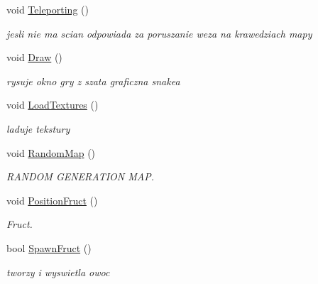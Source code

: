 \begin{DoxyCompactItemize}
\mbox{\label{class_snake_aadebf75d231d0c24c5d54cf7468ef857}} 
void \mbox{\hyperlink{class_snake_aadebf75d231d0c24c5d54cf7468ef857}{Teleporting}} ()
\begin{DoxyCompactList}\small\item\em jesli nie ma scian odpowiada za poruszanie weza na krawedziach mapy \end{DoxyCompactList}\item 
\mbox{\label{class_snake_a819c70fc5ed3dbb1b31eca548f659e8b}} 
void \mbox{\hyperlink{class_snake_a819c70fc5ed3dbb1b31eca548f659e8b}{Draw}} ()
\begin{DoxyCompactList}\small\item\em rysuje okno gry z szata graficzna snake\textquotesingle{}a \end{DoxyCompactList}\item 
\mbox{\label{class_snake_a4664d1acebc5de418688376679736342}} 
void \mbox{\hyperlink{class_snake_a4664d1acebc5de418688376679736342}{Load\+Textures}} ()
\begin{DoxyCompactList}\small\item\em laduje tekstury \end{DoxyCompactList}\item 
void \mbox{\hyperlink{class_snake_a8830006b93d69da00d86377b8c8a8058}{Random\+Map}} ()
\begin{DoxyCompactList}\small\item\em R\+A\+N\+D\+OM G\+E\+N\+E\+R\+A\+T\+I\+ON M\+AP. \end{DoxyCompactList}\item 
void \mbox{\hyperlink{class_snake_a2a2ac1aea96c56217bee0821ee2a3919}{Position\+Fruct}} ()
\begin{DoxyCompactList}\small\item\em Fruct. \end{DoxyCompactList}\item 
bool \mbox{\hyperlink{class_snake_a0110dd9364ea1ef49d969d7347fae938}{Spawn\+Fruct}} ()
\begin{DoxyCompactList}\small\item\em tworzy i wyswietla owoc \end{DoxyCompactList}\end{DoxyCompactItemize}
